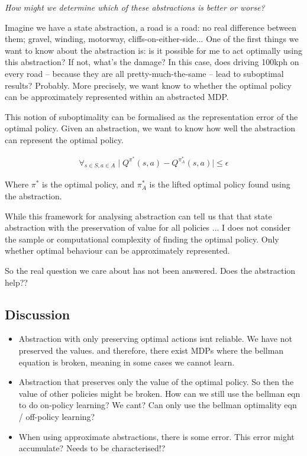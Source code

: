 \begin{displayquote}
\textit{How might we determine which of these abstractions is better or worse?}
\end{displayquote}

Imagine we have a state abstraction, a road is a road: no real difference
between them; gravel, winding, motorway, cliffs-on-either-side...
One of the first things we want to know about the abstraction is:
is it possible for me to act optimally
using this abstraction? If not, what's the damage? In this case, does driving 100kph on every road --
because they are all pretty-much-the-same -- lead to suboptimal results? Probably.
More precisely, we want know to whether the optimal policy can be approximately represented within an abstracted MDP.

This notion of suboptimality can be formalised as the representation error of the optimal
policy. Given an abstraction, we want to know how well
the abstraction can represent the optimal policy.

\begin{align}
\forall_{s\in S, a\in A} \mid Q^{\pi^* }(s, a) - Q^{\pi_{A}^* }(s, a) \mid \le \epsilon
\end{align}

Where $\pi^{* }$ is the optimal policy, and $\pi_{A}^{* }$ is the lifted optimal
policy found using the abstraction.

While this framework \cite{Littman2006, Abel2017} for analysing
abstraction can tell us that that state abstraction with the preservation of value for all policies
 ...
I does not consider the sample or computational complexity of finding the optimal policy.
Only whether optimal behaviour can be approximately represented.

So the real question we care about has not been answered. Does the abstraction help??


\subsection{Discussion}


\begin{itemize}
  \item Abstraction with only preserving optimal actions isnt reliable. We have not preserved the values.
  and therefore, there exist MDPs where the bellman equation is broken, meaning in some cases we cannot learn.
  \item Abstraction that preserves only the value of the optimal policy. So then the value of other policies might be broken.
  How can we still use the bellman eqn to do on-policy learning? We cant? Can only use the bellman optimality eqn / off-policy learning?
  \item When using approximate abstractions, there is some error. This error might accumulate? Needs to be characterised!?
\end{itemize}

